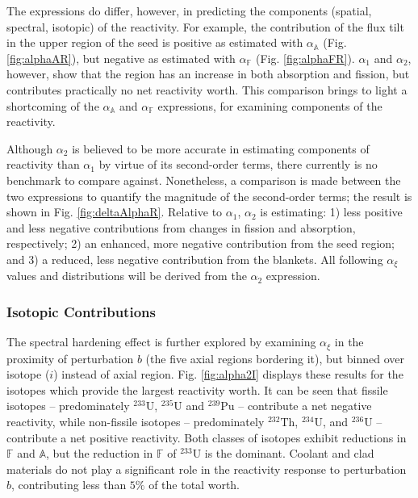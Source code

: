 \documentclass[11pt]{article}
\newcommand{\A}[0]{\mathbb{A}}
\newcommand{\F}[0]{\mathbb{F}}
\newcommand{\iso}[2]{$^{#2}\mathrm{#1}$}
\begin{document}
The expressions do differ, however, in predicting the components (spatial, spectral, isotopic) of the reactivity.
For example, the contribution of the flux tilt in the upper region of the seed is positive as estimated with $\alpha_\A$ (Fig. \ref{fig:alphaAR}), but negative as estimated with $\alpha_\F$ (Fig. \ref{fig:alphaFR}).
$\alpha_1$ and $\alpha_2$, however, show that the region has an increase in both absorption and fission, but contributes practically no net reactivity worth.
This comparison brings to light a shortcoming of the $\alpha_\A$ and $\alpha_\F$ expressions, for examining components of the reactivity.

Although $\alpha_2$ is believed to be more accurate in estimating components of reactivity than $\alpha_1$ by virtue of its second-order terms, there currently is no benchmark to compare against.
Nonetheless, a comparison is made between the two expressions to quantify the magnitude of the second-order terms; the result is shown in Fig. \ref{fig:deltaAlphaR}.
Relative to $\alpha_1$,  $\alpha_2$ is estimating: 1) less positive and less negative contributions from changes in fission and absorption, respectively; 2) an enhanced, more negative contribution from the seed region; and 3) a reduced, less negative contribution from the blankets.
All following $\alpha_\xi$ values and distributions will be derived from the $\alpha_2$ expression.

\subsubsection{Isotopic Contributions}

The spectral hardening effect is further explored by examining $\alpha_\xi$ in the proximity of perturbation $b$ (the five axial regions bordering it), but binned over isotope ($i$) instead of axial region.
Fig. \ref{fig:alpha2I} displays these results for the isotopes which provide the largest reactivity worth.
It can be seen that fissile isotopes -- predominately \iso{U}{233}, \iso{U}{235} and \iso{Pu}{239} -- contribute a net negative reactivity, while non-fissile isotopes -- predominately \iso{Th}{232}, \iso{U}{234}, and \iso{U}{236} -- contribute a net positive reactivity.
Both classes of isotopes exhibit reductions in $\F$ and $\A$, but the reduction in $\F$ of \iso{U}{233} is the dominant.
Coolant and clad materials do not play a significant role in the reactivity response to perturbation $b$, contributing less than $5\%$ of the total worth.
\end{document}
